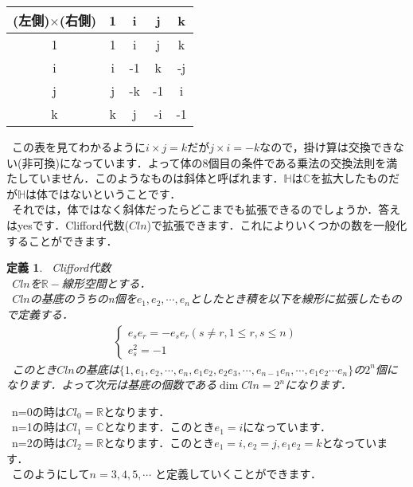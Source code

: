 \documentclass{jreport}
\theoremstyle{idefinition}
\newtheorem{idefi}{定義}[section]
\begin{document}
\begin{center}
\begin{tabular}{|c|c|c|c|c|}\hline
(左側)$\times$(右側) & 1 & i & j & k \\\hline
1 & 1 & i & j & k \\\hline
i & i & -1 & k & -j \\\hline
j & j & -k & -1 & i \\\hline
k & k & j & -i & -1 \\\hline
\end{tabular}
\end{center}


\ この表を見てわかるように$i\times j=k$だが$j\times i=-k$なので，掛け算は交換できない(非可換)になっています．よって体の8個目の条件である乗法の交換法則を満たしていません．このようなものは斜体と呼ばれます．$\mathbb{H}$は$\mathbb{C}$を拡大したものだが$\mathbb{H}$は体ではないということです．\\ 

\ それでは，体ではなく斜体だったらどこまでも拡張できるのでしょうか．答えはyesです．Clifford代数($Cln$)で拡張できます．これによりいくつかの数を一般化することができます．\\

\begin{idefi}
\ Clifford代数\\
\ $Cln$を$\mathbb{R}-$線形空間とする．\\
\ $Cln$の基底のうちのn個を$e_1,e_2,\cdots ,e_n$としたとき積を以下を線形に拡張したもので定義する．\\
\begin{eqnarray}
\left\{
\begin{array}{l}
e_s e_r=-e_s e_r (s\neq r , 1\leq r,s \leq n)\\
e_s^2=-1
\end{array}
\right.
\end{eqnarray}
\ このとき$Cln$の基底は$\{1,e_1,e_2,\cdots,e_n,e_1e_2,e_2e_3,\cdots,e_{n-1}e_n,\cdots,e_1e_2\cdots e_n \}$の$2^n$個になります．よって次元は基底の個数である$\dim{Cln}=2^n$になります．\\
\end{idefi}

\ n=0の時は$Cl_0=\mathbb{R}$となります．\\
\ n=1の時は$Cl_1=\mathbb{C}$となります．このとき$e_1=i$になっています．\\
\ n=2の時は$Cl_2=\mathbb{R}$となります．このとき$e_1=i,e_2=j,e_1e_2=k$となっています．\\
\ このようにして$n=3,4,5,\cdots$ と定義していくことができます．\\
\end{document}
